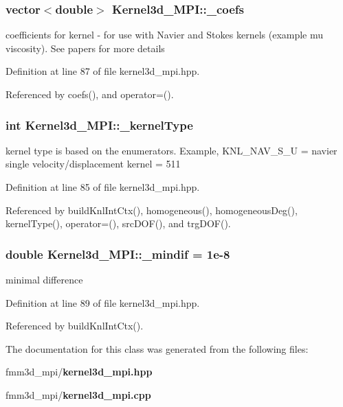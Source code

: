 \subsubsection{\setlength{\rightskip}{0pt plus 5cm}vector$<$double$>$ {\bf Kernel3d\_\-MPI::\_\-coefs}\hspace{0.3cm}{\tt  [protected]}}\label{classKernel3d__MPI_e3219078df8cea5b29e9e7bba8bee2b8_e3219078df8cea5b29e9e7bba8bee2b8}


coefficients for kernel - for use with Navier and Stokes kernels (example mu viscosity). See papers for more details 

Definition at line 87 of file kernel3d\_\-mpi.hpp.

Referenced by coefs(), and operator=().
\subsubsection{\setlength{\rightskip}{0pt plus 5cm}int {\bf Kernel3d\_\-MPI::\_\-kernel\-Type}\hspace{0.3cm}{\tt  [protected]}}\label{classKernel3d__MPI_6a4a9be8986c11a7006e77e743719e6c_6a4a9be8986c11a7006e77e743719e6c}


kernel type is based on the enumerators. Example, KNL\_\-NAV\_\-S\_\-U = navier single velocity/displacement kernel = 511 

Definition at line 85 of file kernel3d\_\-mpi.hpp.

Referenced by build\-Knl\-Int\-Ctx(), homogeneous(), homogeneous\-Deg(), kernel\-Type(), operator=(), src\-DOF(), and trg\-DOF().
\subsubsection{\setlength{\rightskip}{0pt plus 5cm}double {\bf Kernel3d\_\-MPI::\_\-mindif} = 1e-8\hspace{0.3cm}{\tt  [static, protected]}}\label{classKernel3d__MPI_318abafeb7df979cf115fabc3bd24b53_318abafeb7df979cf115fabc3bd24b53}


minimal difference 

Definition at line 89 of file kernel3d\_\-mpi.hpp.

Referenced by build\-Knl\-Int\-Ctx().

The documentation for this class was generated from the following files:\begin{CompactItemize}
\item 
fmm3d\_\-mpi/{\bf kernel3d\_\-mpi.hpp}\item 
fmm3d\_\-mpi/{\bf kernel3d\_\-mpi.cpp}\end{CompactItemize}
